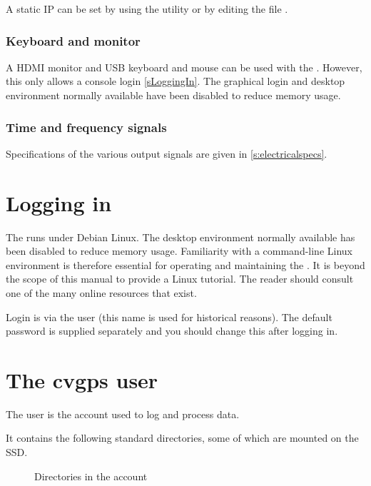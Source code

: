 A static IP can be set by using the utility  or by editing the file 
.

\subsubsection{Keyboard and monitor}

A HDMI monitor and USB keyboard and mouse can be used with the \sysname{}. 
However, this only allows a console login \ref{sLoggingIn}.
The graphical login and desktop environment normally available have been disabled to reduce memory usage.


\subsubsection{Time and frequency signals}

Specifications of the various output signals are given in \ref{s:electricalspecs}.

\section{Logging in \label{sLoggingIn}}

The \sysname{} runs under Debian Linux. The desktop environment normally available has been disabled to reduce memory usage.
Familiarity with a command-line Linux environment is therefore essential for operating and maintaining
the \sysname{}. It is beyond the scope of this manual to provide a Linux tutorial. The reader should 
consult one of the many online resources that exist.

Login is via the user  (this name is used for historical reasons). 
The default password is supplied separately and you should change
this after logging in.

\section{The cvgps user}

The  user is the account used to log and process data.

It contains the following standard directories, some of which are mounted on the SSD.

\begin{figure}[ht]
\caption{Directories in the  account}
\end{figure}

